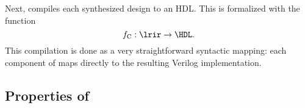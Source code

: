 

\subsubsection{\HDLCompilation}
Next, \lrfn compiles each synthesized design
  to an HDL. This is formalized with the function
  \[\HDLCompFn: \lrir \rightarrow \HDL.\]
This compilation is done as a very 
  straightforward syntactic mapping:
  each component
  of \lrir maps directly to the
  resulting Verilog implementation.

%
%


  

\subsection{Properties of \lrfn{}}

